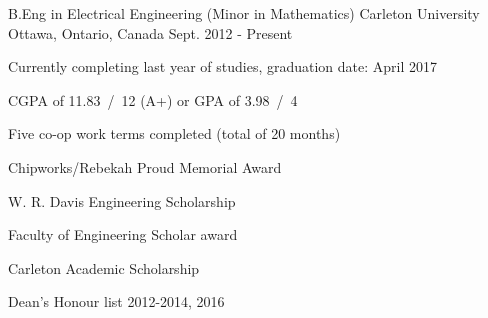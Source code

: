 

\begin{cventries}

  \cventry
    {B.Eng in Electrical Engineering (Minor in Mathematics)} %
    {Carleton University} %
    {Ottawa, Ontario, Canada} %
    {Sept. 2012 - Present} %
    {
      \begin{cvitems} %
        \item {Currently completing last year of studies, graduation date: April 2017}
        \item {CGPA of 11.83~/~12 (A+) or GPA of 3.98~/~4}
        \item {Five co-op work terms completed (total of 20 months)}
        \item {Chipworks/Rebekah Proud Memorial Award}
        \item {W. R. Davis Engineering Scholarship}
        \item {Faculty of Engineering Scholar award}
        \item {Carleton Academic Scholarship}
        \item {Dean's Honour list 2012-2014, 2016}
      \end{cvitems}
    }

\end{cventries}

